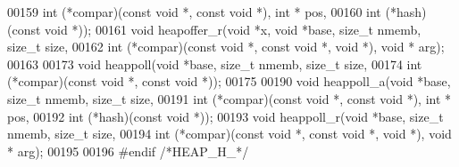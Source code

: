 \begin{DoxyCode}
00159                 \textcolor{keywordtype}{int} (*compar)(\textcolor{keyword}{const} \textcolor{keywordtype}{void} *, \textcolor{keyword}{const} \textcolor{keywordtype}{void} *), \textcolor{keywordtype}{int} * pos,
00160                 \textcolor{keywordtype}{int} (*hash)(\textcolor{keyword}{const} \textcolor{keywordtype}{void} *));
00161 \textcolor{keywordtype}{void} heapoffer\_r(\textcolor{keywordtype}{void} *x, \textcolor{keywordtype}{void} *base, \textcolor{keywordtype}{size\_t} nmemb, \textcolor{keywordtype}{size\_t} size,
00162                 \textcolor{keywordtype}{int} (*compar)(\textcolor{keyword}{const} \textcolor{keywordtype}{void} *, \textcolor{keyword}{const} \textcolor{keywordtype}{void} *, \textcolor{keywordtype}{void} *), \textcolor{keywordtype}{void} * arg);
00163 
00173 \textcolor{keywordtype}{void} heappoll(\textcolor{keywordtype}{void} *base, \textcolor{keywordtype}{size\_t} nmemb, \textcolor{keywordtype}{size\_t} size,
00174                 \textcolor{keywordtype}{int} (*compar)(\textcolor{keyword}{const} \textcolor{keywordtype}{void} *, \textcolor{keyword}{const} \textcolor{keywordtype}{void} *));
00175 
00190 \textcolor{keywordtype}{void} heappoll_a(\textcolor{keywordtype}{void} *base, \textcolor{keywordtype}{size\_t} nmemb, \textcolor{keywordtype}{size\_t} size,
00191                 \textcolor{keywordtype}{int} (*compar)(\textcolor{keyword}{const} \textcolor{keywordtype}{void} *, \textcolor{keyword}{const} \textcolor{keywordtype}{void} *), \textcolor{keywordtype}{int} * pos,
00192                 \textcolor{keywordtype}{int} (*hash)(\textcolor{keyword}{const} \textcolor{keywordtype}{void} *));
00193 \textcolor{keywordtype}{void} heappoll\_r(\textcolor{keywordtype}{void} *base, \textcolor{keywordtype}{size\_t} nmemb, \textcolor{keywordtype}{size\_t} size,
00194                 \textcolor{keywordtype}{int} (*compar)(\textcolor{keyword}{const} \textcolor{keywordtype}{void} *, \textcolor{keyword}{const} \textcolor{keywordtype}{void} *, \textcolor{keywordtype}{void} *), \textcolor{keywordtype}{void} * arg);
00195 
00196 \textcolor{preprocessor}{#endif }\textcolor{comment}{/*HEAP\_H\_*/}\textcolor{preprocessor}{}
\end{DoxyCode}

